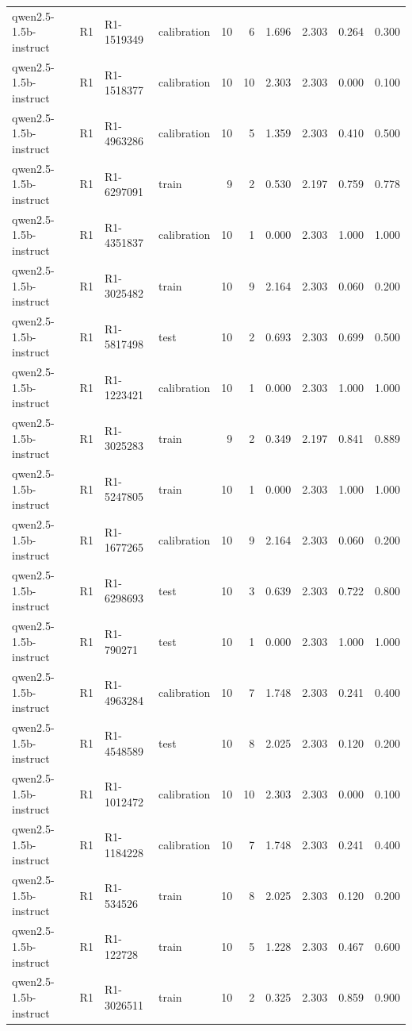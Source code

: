 \begin{table}
\begin{tabular}{llllrrrrrr}
qwen2.5-1.5b-instruct & R1 & R1-1519349 & calibration & 10 & 6 & 1.696 & 2.303 & 0.264 & 0.300 \\
qwen2.5-1.5b-instruct & R1 & R1-1518377 & calibration & 10 & 10 & 2.303 & 2.303 & 0.000 & 0.100 \\
qwen2.5-1.5b-instruct & R1 & R1-4963286 & calibration & 10 & 5 & 1.359 & 2.303 & 0.410 & 0.500 \\
qwen2.5-1.5b-instruct & R1 & R1-6297091 & train & 9 & 2 & 0.530 & 2.197 & 0.759 & 0.778 \\
qwen2.5-1.5b-instruct & R1 & R1-4351837 & calibration & 10 & 1 & 0.000 & 2.303 & 1.000 & 1.000 \\
qwen2.5-1.5b-instruct & R1 & R1-3025482 & train & 10 & 9 & 2.164 & 2.303 & 0.060 & 0.200 \\
qwen2.5-1.5b-instruct & R1 & R1-5817498 & test & 10 & 2 & 0.693 & 2.303 & 0.699 & 0.500 \\
qwen2.5-1.5b-instruct & R1 & R1-1223421 & calibration & 10 & 1 & 0.000 & 2.303 & 1.000 & 1.000 \\
qwen2.5-1.5b-instruct & R1 & R1-3025283 & train & 9 & 2 & 0.349 & 2.197 & 0.841 & 0.889 \\
qwen2.5-1.5b-instruct & R1 & R1-5247805 & train & 10 & 1 & 0.000 & 2.303 & 1.000 & 1.000 \\
qwen2.5-1.5b-instruct & R1 & R1-1677265 & calibration & 10 & 9 & 2.164 & 2.303 & 0.060 & 0.200 \\
qwen2.5-1.5b-instruct & R1 & R1-6298693 & test & 10 & 3 & 0.639 & 2.303 & 0.722 & 0.800 \\
qwen2.5-1.5b-instruct & R1 & R1-790271 & test & 10 & 1 & 0.000 & 2.303 & 1.000 & 1.000 \\
qwen2.5-1.5b-instruct & R1 & R1-4963284 & calibration & 10 & 7 & 1.748 & 2.303 & 0.241 & 0.400 \\
qwen2.5-1.5b-instruct & R1 & R1-4548589 & test & 10 & 8 & 2.025 & 2.303 & 0.120 & 0.200 \\
qwen2.5-1.5b-instruct & R1 & R1-1012472 & calibration & 10 & 10 & 2.303 & 2.303 & 0.000 & 0.100 \\
qwen2.5-1.5b-instruct & R1 & R1-1184228 & calibration & 10 & 7 & 1.748 & 2.303 & 0.241 & 0.400 \\
qwen2.5-1.5b-instruct & R1 & R1-534526 & train & 10 & 8 & 2.025 & 2.303 & 0.120 & 0.200 \\
qwen2.5-1.5b-instruct & R1 & R1-122728 & train & 10 & 5 & 1.228 & 2.303 & 0.467 & 0.600 \\
qwen2.5-1.5b-instruct & R1 & R1-3026511 & train & 10 & 2 & 0.325 & 2.303 & 0.859 & 0.900 \\

\end{tabular}
\end{table}
